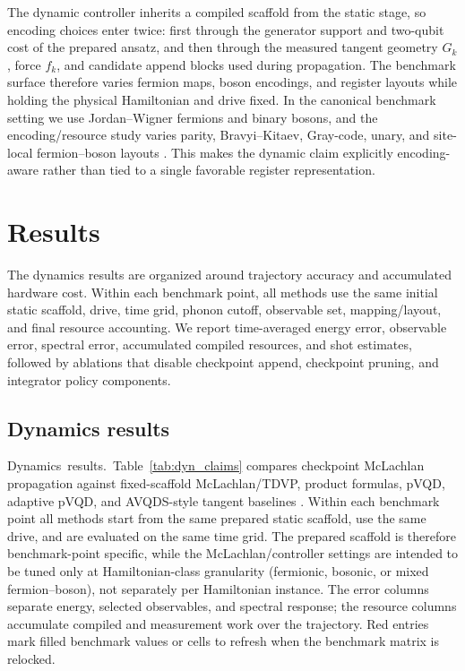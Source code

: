 \documentclass[
  reprint,
  amsmath,
  amssymb,
  aps,
  pra,
  nofootinbib,
  superscriptaddress,
  floatfix
]{revtex4-2}
\newcommand{\placeholder}[1]{\textcolor{red!70!black}{\ifmmode\left[#1\right]\else\textsf{[#1]}\fi}}
\newcommand{\tentative}[1]{\textcolor{red!70!black}{#1}}
\newcommand{\structlabel}[1]{\noindent\mbox{\tentative{#1.}}~}
\begin{document}
The dynamic controller inherits a compiled scaffold from the static stage, so encoding choices enter twice: first through the generator support and two-qubit cost of the prepared ansatz, and then through the measured tangent geometry $G_k$, force $f_k$, and candidate append blocks used during propagation. The benchmark surface therefore varies fermion maps, boson encodings, and register layouts while holding the physical Hamiltonian and drive fixed. In the canonical benchmark setting we use Jordan--Wigner fermions and binary bosons, and the encoding/resource study varies parity, Bravyi--Kitaev, Gray-code, unary, and site-local fermion--boson layouts \cite{Macridin2018,Macridin2018PRA,Sawaya2020,Li2023}. %
This makes the dynamic claim explicitly encoding-aware rather than tied to a single favorable register representation.


\section{Results}
\label{sec:results}
\label{sec:benchmarks}

The dynamics results are organized around trajectory accuracy and accumulated hardware cost. Within each benchmark point, all methods use the same initial static scaffold, drive, time grid, phonon cutoff, observable set, mapping/layout, and final resource accounting. We report time-averaged energy error, observable error, spectral error, accumulated compiled resources, and shot estimates, followed by ablations that disable checkpoint append, checkpoint pruning, and integrator policy components.

\subsection{Dynamics results}

\structlabel{Dynamics results}Table~\ref{tab:dyn_claims} compares checkpoint McLachlan propagation against fixed-scaffold McLachlan/TDVP, product formulas, pVQD, adaptive pVQD, and AVQDS-style tangent baselines \cite{McLachlan1964,Barison2021,Suzuki1985,Suzuki1990,ChildsSu2019ProductFormula,ChildsOstranderSu2019RandomizedPF,Campbell2019QDRIFT,Yao2021,Linteau2024,Zhang2025}. %
Within each benchmark point all methods start from the same prepared static scaffold, use the same drive, and are evaluated on the same time grid. The prepared scaffold is therefore benchmark-point specific, while the McLachlan/controller settings are intended to be tuned only at Hamiltonian-class granularity (fermionic, bosonic, or mixed fermion--boson), not separately per Hamiltonian instance. The error columns separate energy, selected observables, and spectral response; the resource columns accumulate compiled and measurement work over the trajectory. Red entries mark filled benchmark values or cells to refresh when the benchmark matrix is relocked.
\end{document}
